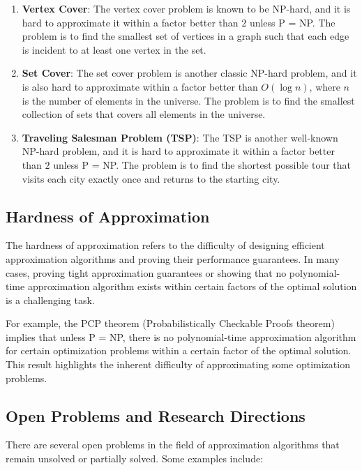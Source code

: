 \documentclass[12pt]{book} %
\begin{document}
\begin{enumerate}
    \item \textbf{Vertex Cover}: The vertex cover problem is known to be NP-hard, and it is hard to approximate it within a factor better than \(2\) unless P = NP. The problem is to find the smallest set of vertices in a graph such that each edge is incident to at least one vertex in the set.
    
    \item \textbf{Set Cover}: The set cover problem is another classic NP-hard problem, and it is also hard to approximate within a factor better than \(O(\log n)\), where \(n\) is the number of elements in the universe. The problem is to find the smallest collection of sets that covers all elements in the universe.
    
    \item \textbf{Traveling Salesman Problem (TSP)}: The TSP is another well-known NP-hard problem, and it is hard to approximate it within a factor better than \(2\) unless P = NP. The problem is to find the shortest possible tour that visits each city exactly once and returns to the starting city.
\end{enumerate}

\subsection{Hardness of Approximation}

The hardness of approximation refers to the difficulty of designing efficient approximation algorithms and proving their performance guarantees. In many cases, proving tight approximation guarantees or showing that no polynomial-time approximation algorithm exists within certain factors of the optimal solution is a challenging task.

For example, the PCP theorem (Probabilistically Checkable Proofs theorem) implies that unless P = NP, there is no polynomial-time approximation algorithm for certain optimization problems within a certain factor of the optimal solution. This result highlights the inherent difficulty of approximating some optimization problems.

\subsection{Open Problems and Research Directions}

There are several open problems in the field of approximation algorithms that remain unsolved or partially solved. Some examples include:
\end{document}

